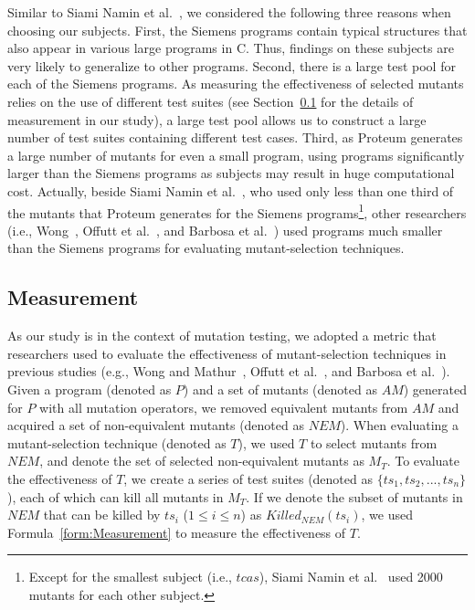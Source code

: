 Similar to Siami Namin et al.~\cite{SiamiNamin:08}, we considered
the following three reasons when choosing our subjects. First, the
Siemens programs contain typical structures that also appear in
various large programs in C. Thus, findings on these subjects are
very likely to generalize to other programs. Second, there is a
large test pool for each of the Siemens programs. As measuring the
effectiveness of selected mutants relies on the use of different
test suites (see Section~\ref{Measurement} for the details of
measurement in our study), a large test pool allows us to
construct a large number of test suites containing different test
cases. Third, as Proteum generates a large number of mutants for
even a small program, using programs significantly larger than the
Siemens programs as subjects may result in huge computational
cost. Actually, beside Siami Namin et al.~\cite{SiamiNamin:08},
who used only less than one third of the mutants that Proteum
generates for the Siemens programs\footnote{Except for the
smallest subject (i.e., $tcas$), Siami Namin et
al.~\cite{SiamiNamin:08} used 2000 mutants for each other
subject.}, other researchers (i.e., Wong~\cite{Wong:93}, Offutt et
al.~\cite{Offutt:96}, and Barbosa et al.~\cite{Barbosa:01}) used
programs much smaller than the Siemens programs for evaluating
mutant-selection techniques.


\vspace{-1ex}
\subsection{Measurement}
\label{Measurement}

As our study is in the context of mutation testing, we adopted a
metric that researchers used to evaluate the effectiveness of
mutant-selection techniques in previous studies (e.g., Wong and
Mathur~\cite{Wong:93,Wong:95}, Offutt et al.~\cite{Offutt:96}, and
Barbosa et al.~\cite{Barbosa:01}). Given a program (denoted as
$P$) and a set of mutants (denoted as $AM$) generated for $P$ with
all mutation operators, we removed equivalent mutants from $AM$
and acquired a set of non-equivalent mutants (denoted as $NEM$).
When evaluating a mutant-selection technique (denoted as $T$), we
used $T$ to select mutants from $NEM$, and denote the set of
selected non-equivalent mutants as $M_T$. To evaluate the
effectiveness of $T$, we create a series of test suites (denoted
as $\{ts_1, ts_2, ..., ts_n\}$), each of which can kill all
mutants in $M_T$. If we denote the subset of mutants in $NEM$ that
can be killed by $ts_i$ ($1\leq$$i$$\leq$$n$) as
$Killed_{NEM}(ts_i)$, we used Formula~\ref{form:Measurement} to
measure the effectiveness of $T$.\vspace{-2ex}

